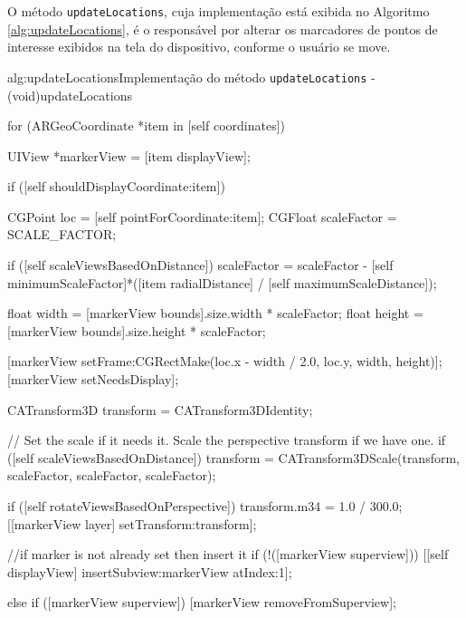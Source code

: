 O método \texttt{updateLocations}, cuja implementação está exibida no Algoritmo
\ref{alg:updateLocations}, é o responsável por alterar os marcadores de pontos de
interesse exibidos na tela do dispositivo, conforme o usuário se move.

\begin{sourcecode}{alg:updateLocations}{Implementação do método \texttt{updateLocations}}
- (void)updateLocations
{
	for (ARGeoCoordinate *item in [self coordinates]) {

        UIView *markerView = [item displayView];

		if ([self shouldDisplayCoordinate:item]) {

            CGPoint loc = [self pointForCoordinate:item];
            CGFloat scaleFactor = SCALE_FACTOR;

			if ([self scaleViewsBasedOnDistance]) 
				scaleFactor = scaleFactor - [self minimumScaleFactor]*([item radialDistance] / [self maximumScaleDistance]);

			float width	 = [markerView bounds].size.width  * scaleFactor;
			float height = [markerView bounds].size.height * scaleFactor;

			[markerView setFrame:CGRectMake(loc.x - width / 2.0, loc.y, width, height)];
            [markerView setNeedsDisplay];

			CATransform3D transform = CATransform3DIdentity;

			// Set the scale if it needs it. Scale the perspective transform if we have one.
			if ([self scaleViewsBasedOnDistance]) 
				transform = CATransform3DScale(transform, scaleFactor, scaleFactor, scaleFactor);

			if ([self rotateViewsBasedOnPerspective]) {
				transform.m34 = 1.0 / 300.0;
			}
			[[markerView layer] setTransform:transform];

			//if marker is not already set then insert it
			if (!([markerView superview])) {
				[[self displayView] insertSubview:markerView atIndex:1];
			}
		} 
		else 
            if ([markerView superview])
                [markerView removeFromSuperview];

	}
}
\end{sourcecode}







